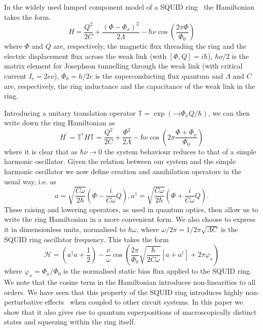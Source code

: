 \documentclass[twocolumn,a4paper,superscriptaddress,showpacs,floatfix,pra]{revtex4}
\begin{document}
In   the   widely   used   lumped   component   model   of   a   SQUID
ring~\cite{Spi1992,SrivastavaW87} the Hamiltonian takes the form.
\begin{equation}
H=\frac{Q^{2}}{2C}+\frac{\left( \Phi  -\Phi _{x}\right) ^{2}}{2\Lambda
}-\hbar   \nu  \cos   \left(  \frac{2\pi   \Phi   }{\Phi  _{0}}\right)
\label{HamSQUID}
\end{equation}
where $\Phi $  and $Q$ are, respectively, the  magnetic flux threading
the ring and the electric displacement flux across the weak link (with
$\left[  \Phi ,Q\right]  =i\hbar  $),  $\hbar \nu  /2$  is the  matrix
element for Josephson tunnelling  through the weak link (with critical
current $I_{c}=2e\nu $), $\Phi  _{0}=h/2e$ is the superconducting flux
quantum and $\Lambda $ and  $C$ are, respectively, the ring inductance
and the capacitance of the weak link in the ring.

Introducing  a unitary  translation  operator $\mathbb{T}=\exp  \left(
-i\Phi  _{x}Q/\hbar  \right)  $,  we  can then  write  down  the  ring
Hamiltonian as
\begin{equation}
H^{\prime }={\mathbb{T}}^{\dagger }H{\mathbb{T}}=\frac{Q^{2}}{2C}+\frac{\Phi
^{2}}{2\Lambda }-\hbar \nu \cos \left( 2\pi \frac{\Phi +\Phi _{x}}{\Phi _{0}}\right)  \label{eq:HamST}
\end{equation}
where  it  is clear  that  as $\hbar  \nu  \rightarrow  0$ the  system
behaviour reduces to  that of a simple harmonic  oscillator. Given the
relation between our system and  the simple harmonic oscillator we now
define creation and annihilation operators in the usual way, i.e. as
\begin{equation*}
a=\sqrt{\frac{C\omega }{2\hbar }}\left( \Phi -\frac{i}{C\omega }Q\right)
,a^{\dagger }=\sqrt{\frac{C\omega }{2\hbar }}\left( \Phi +\frac{i}{C\omega }
Q\right) .
\end{equation*}
These raising and lowering operators,  as used in quantum optics, then
allow us to  write the ring Hamiltonian in a  more convenient form. We
also choose to express it in dimensionless units, normalised to $\hbar
\omega $, where  $\omega /2\pi =1/2\pi \sqrt{\Lambda C}$  is the SQUID
ring oscillator frequency. This takes the form
\begin{equation}
\mathcal{H}=\left( a^{\dagger }a+\frac{1}{2}\right) -\frac{\nu }{\omega }\cos \left( \frac{2\pi }{\Phi _{0}}\sqrt{\frac{\hbar }{2C\omega }}\left[
a+a^{\dagger }\right] +2\pi \varphi _{x}\right)  \label{HamNorm}
\end{equation}
where $\varphi _{x}=\Phi _{x}/\Phi _{0}$ is the normalised static bias
flux applied  to the SQUID ring. We  note that the cosine  term in the
Hamiltonian  introduces non-linearities  to all  orders. We  have seen
that   this   property   of   the   SQUID   ring   introduces   highly
non-perturbative  effects~\cite{EverittSCVRPP01,EverittCSPPVR01}  when
coupled to other  circuit systems. In this paper we  show that it also
gives  rise  to  quantum  superpositions of  macroscopically  distinct
states and squeezing within the ring itself.
\end{document}
